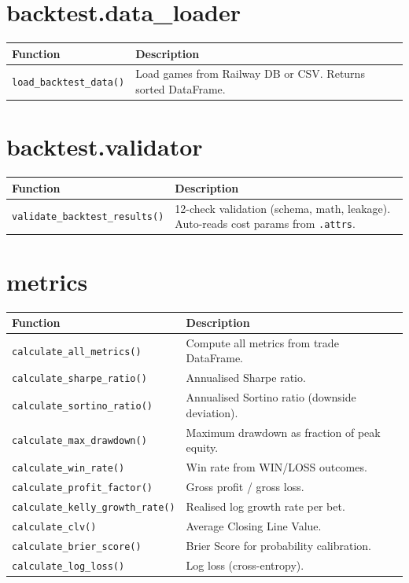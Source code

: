 \documentclass[12pt,a4paper]{report}
\theoremstyle{definition}
\newcommand{\code}[1]{\texttt{#1}}
\newcommand{\func}[1]{\texttt{#1()}}
\begin{document}
\section{backtest.data\_loader}

\begin{longtable}{lp{9cm}}
\toprule
\textbf{Function} & \textbf{Description} \\
\midrule
\endhead
\func{load\_backtest\_data} & Load games from Railway DB or CSV. Returns sorted DataFrame. \\
\bottomrule
\end{longtable}

\section{backtest.validator}

\begin{longtable}{lp{9cm}}
\toprule
\textbf{Function} & \textbf{Description} \\
\midrule
\endhead
\func{validate\_backtest\_results} & 12-check validation (schema, math, leakage). Auto-reads cost params from \code{.attrs}. \\
\bottomrule
\end{longtable}

\section{metrics}

\begin{longtable}{lp{9cm}}
\toprule
\textbf{Function} & \textbf{Description} \\
\midrule
\endhead
\func{calculate\_all\_metrics} & Compute all metrics from trade DataFrame. \\
\func{calculate\_sharpe\_ratio} & Annualised Sharpe ratio. \\
\func{calculate\_sortino\_ratio} & Annualised Sortino ratio (downside deviation). \\
\func{calculate\_max\_drawdown} & Maximum drawdown as fraction of peak equity. \\
\func{calculate\_win\_rate} & Win rate from WIN/LOSS outcomes. \\
\func{calculate\_profit\_factor} & Gross profit / gross loss. \\
\func{calculate\_kelly\_growth\_rate} & Realised log growth rate per bet. \\
\func{calculate\_clv} & Average Closing Line Value. \\
\func{calculate\_brier\_score} & Brier Score for probability calibration. \\
\func{calculate\_log\_loss} & Log loss (cross-entropy). \\
\bottomrule
\end{longtable}
\end{document}
